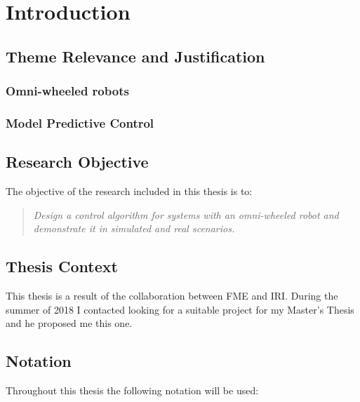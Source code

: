 %
\chapter{Introduction} \label{chap::intro}

\section{Theme Relevance and Justification}

\subsection{Omni-wheeled robots}

\subsection{Model Predictive Control}

\section{Research Objective}
The objective of the research included in this thesis is to:

\begin{quote}
	\emph{
		Design a control algorithm for systems with an omni-wheeled robot and demonstrate it in simulated and real scenarios.
	}
\end{quote}

\section{Thesis Context}

This thesis is a result of the collaboration between \ac{FME} and \ac{IRI}. During the summer of 2018 I contacted \mscsupervisorone looking for a suitable project for my Master's Thesis and he proposed me this one.

\section{Notation}

Throughout this thesis the following notation will be used:

